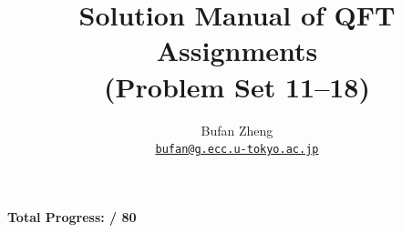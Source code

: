 \documentclass[11pt]{article}
\title{\Huge Solution Manual of QFT Assignments\\(Problem Set 11--18)}
\author{Bufan Zheng\\ \href{mailto:bufan@g.ecc.u-tokyo.ac.jp}{\texttt{bufan@g.ecc.u-tokyo.ac.jp}} }
\date{}
\newcounter{numSolved}
\newcommand{\totalQuestions}{80}
\begin{document}
	
	\maketitle
	
	\begin{center}
		\Large\textbf{Total Progress:  / \totalQuestions}
	\end{center}
	
	\listofmyproblem
	
	\clearpage
	
	\clearpage
	
	\clearpage
	
	\clearpage
	
	\clearpage
	
	\clearpage
	
	\clearpage
	
	\clearpage
	
	
\end{document}
